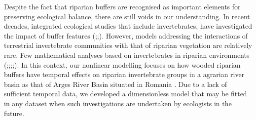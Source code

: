 \documentclass[12pt]{article}
\numberwithin{equation}{section}
\begin{document}
Despite the fact that riparian buffers are recognised as important elements for preserving ecological balance, there are still voids in our understanding. In recent decades, integrated ecological studies that include invertebrates, have investigated the impact of buffer features (\cite{forio2020small};\cite{flory1999};\cite{kawaguchi2001}). However, models addressing the interactions of terrestrial invertebrate communities with that of riparian vegetation are relatively rare. Few mathematical analyses based on invertebrates in riparian environments (\cite{steward2022};\cite{wipfli1997};\cite{sabo2002};\cite{you2015};\cite{burdon2020}). In this context, our nonlinear modelling focuses on how wooded riparian buffers have temporal effects on riparian invertebrate groups in a agrarian river basin as that of Arges River Basin situated in Romania \cite{popescu2021riparian}. Due to a lack of sufficient temporal data, we developed a dimensionless model that may be fitted in any dataset when such investigations are undertaken by ecologists in the future.\\
\vspace{-1cm}
\end{document}
